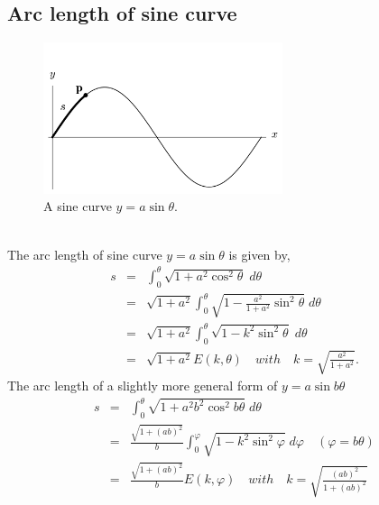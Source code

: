 \documentclass{article}
\begin{document}
\subsection{Arc length of sine curve}
\label{sec-2-2}
\begin{figure}[htb]
\centering
\includegraphics[width=70mm]{./sine_curve_generic.png}
\caption{\label{fig:generic_sine_curve}A sine curve $y = a \sin{\theta}$.}
\end{figure} \\
The arc length of sine curve $y = a \sin{\theta}$ is given by,
\begin{eqnarray}
s &=&  \int_{0}^{\theta} \sqrt{ 1  +   a^{2} \cos^{2}{\theta}} \; d\theta \\ \nonumber
  &=& \sqrt{1 +a^{2}} \int_{0}^{\theta} \sqrt{ 1  -   \frac{a^{2}}{1 +a ^{2}} \sin^{2}{\theta}} \; d\theta \\ \nonumber
  &=& \sqrt{1 +a^{2}} \int_{0}^{\theta} \sqrt{ 1  -   k^{2} \sin^{2}{\theta}} \; d\theta \\ \nonumber
  &=& \sqrt{1 +a^{2}} E(k, \theta) \quad with \quad k = \sqrt{\frac{a^{2}}{1+a^{2}}}.
\end{eqnarray}
The arc length of a slightly more general form of $y = a \sin{b \theta}$
\begin{eqnarray}
s &=&  \int_{0}^{\theta} \sqrt{ 1  +   a^{2} b^{2} \cos^{2}{ b \theta}} \; d\theta \\ \nonumber
  &=& \frac{\sqrt{1 +(ab)^{2}}}{b} \int_{0}^{\varphi} \sqrt{ 1  -   k^{2} \sin^{2}{\varphi}} \; d\varphi \quad (\varphi = b\theta) \\ \nonumber
  &=& \frac{\sqrt{1 +(ab)^{2}}}{b} E(k, \varphi) \quad with \quad k = \sqrt{\frac{(ab)^{2}}{1+(ab)^{2}}}
\end{eqnarray}
\end{document}
